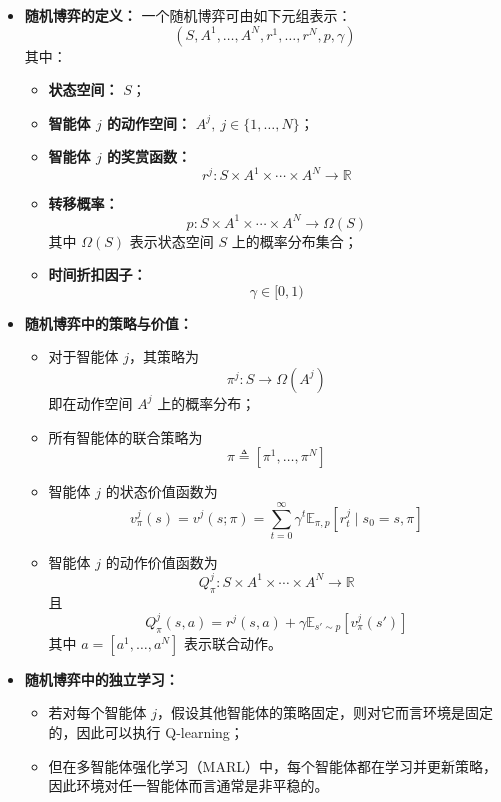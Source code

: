 \documentclass[../main.tex]{subfiles}
\begin{document}
\begin{enumerate}
\begin{itemize}
        \item \textbf{随机博弈的定义：}
        一个随机博弈可由如下元组表示：
        $$
        (S,A^1,\ldots,A^N,r^1,\ldots,r^N,p,\gamma)
        $$
        其中：
        \begin{itemize}
            \item \textbf{状态空间：} $S$；
            \item \textbf{智能体 $j$ 的动作空间：} $A^j,\ j\in\{1,\ldots,N\}$；
            \item \textbf{智能体 $j$ 的奖赏函数：}
            $$
            r^j:S\times A^1\times \cdots \times A^N \to \mathbb{R}
            $$
            \item \textbf{转移概率：}
            $$
            p:S\times A^1\times \cdots \times A^N \to \Omega(S)
            $$
            其中 $\Omega(S)$ 表示状态空间 $S$ 上的概率分布集合；
            \item \textbf{时间折扣因子：}
            $$
            \gamma\in[0,1)
            $$
        \end{itemize}

        \item \textbf{随机博弈中的策略与价值：}
        \begin{itemize}
            \item 对于智能体 $j$，其策略为
            $$
            \pi^j:S\to \Omega(A^j)
            $$
            即在动作空间 $A^j$ 上的概率分布；
            \item 所有智能体的联合策略为
            $$
            \pi \triangleq [\pi^1,\ldots,\pi^N]
            $$
            \item 智能体 $j$ 的状态价值函数为
            $$
            v_\pi^j(s)=v^j(s;\pi)=\sum_{t=0}^{\infty}\gamma^t\mathbb{E}_{\pi,p}[r_t^j\mid s_0=s,\pi]
            $$
            \item 智能体 $j$ 的动作价值函数为
            $$
            Q_\pi^j:S\times A^1\times \cdots \times A^N \to \mathbb{R}
            $$
            且
            $$
            Q_\pi^j(s,a)=r^j(s,a)+\gamma \mathbb{E}_{s'\sim p}[v_\pi^j(s')]
            $$
            其中 $a=[a^1,\ldots,a^N]$ 表示联合动作。
        \end{itemize}

        \item \textbf{随机博弈中的独立学习：}
        \begin{itemize}
            \item 若对每个智能体 $j$，假设其他智能体的策略固定，则对它而言环境是固定的，因此可以执行 Q-learning；
            \item 但在多智能体强化学习（MARL）中，每个智能体都在学习并更新策略，因此环境对任一智能体而言通常是非平稳的。
        \end{itemize}


\end{itemize}
\end{enumerate}
\end{document}
